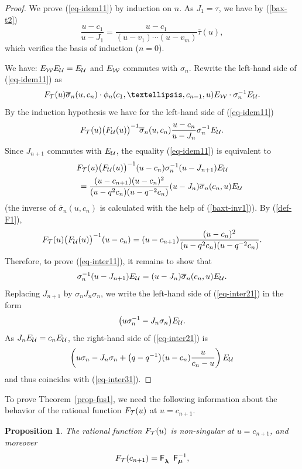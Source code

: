\documentclass[11pt]{article}
\newcommand{\bsi}{{\overline{\sigma}}}
\newcommand{\bta}{{\overline{\tau}}}
\newcommand{\lam}{\boldsymbol{\lambda}}
\newcommand{\mum}{\boldsymbol{\mu}}
\newtheorem{Proposition}[Theorem]{Proposition}
\begin{document}
\begin{proof} We prove (\ref{eq-idem11}) by induction on $n$.
As $J_1=\tau$, we have by (\ref{bax-t2})
\[
\frac{u-c_{1}}{u-J_{1}}=\frac{u-c_{1}}{(u-v_1)\cdots(u-v_m)}\bta(u)  ,
\]
which verif\/ies the basis of induction ($n=0$).


We have: $E_{{\cal{W}}}E_{{\cal{U}}}=E_{{\cal{U}}}$ and $E_{{\cal{W}}}$ commutes with $\sigma_n$.
Rewrite the left-hand side of (\ref{eq-idem11}) as
\[
F_{{\cal{T}}}(u)\bsi_{n}(u,c_n)\cdot\phi_n(c_1,\dots,c_{n-1},u) E_{{\cal{W}}}\cdot\sigma_n^{-1} E_{{\cal{U}}} .
 \]
By the induction hypothesis we have for the left-hand side of (\ref{eq-idem11})
\[
F_{{\cal{T}}}(u)\bigl(F_{{\cal{U}}}(u)\bigr)^{-1}\bsi_{n}(u,c_n)\frac{u-c_n}{u-J_n}\sigma_n^{-1} E_{{\cal{U}}} .
\]
Since $J_{n+1}$ commutes with $E_{{\cal{U}}}$, the equality (\ref{eq-idem11}) is equivalent to
\begin{gather}
F_{{\cal{T}}}(u)\bigl(F_{{\cal{U}}}(u)\bigr)^{-1}(u-c_n)\sigma_n^{-1}(u-J_{n+1})E_{{\cal{U}}}\nonumber\\
\qquad{}=
 {\frac{(u-c_{n+1})(u-c_n)^2}{(u-q^2c_n)(u-q^{-2}c_n)}}(u-J_n)\bsi_{n}(c_n,u)E_{{\cal{U}}} \label{eq-inter11}
\end{gather}
(the inverse of $\bsi_{n}(u,c_n)$ is calculated with the help of (\ref{baxt-inv1})).
By (\ref{def-F1}),
\begin{gather*}%
F_{{\cal{T}}}(u)\bigl(F_{{\cal{U}}}(u)\bigr)^{-1}(u-c_n)=(u-c_{n+1})\frac{(u-c_n)^2}{(u-q^2c_n)(u-q^{-2}c_n)}.
\end{gather*}
Therefore, to prove (\ref{eq-inter11}), it remains to show that
\begin{gather}\label{eq-inter21}
\sigma_n^{-1}(u-J_{n+1})E_{{\cal{U}}}=(u-J_n)\bsi_{n}(c_n,u)E_{{\cal{U}}}.
\end{gather}
Replacing $J_{n+1}$ by $\sigma_nJ_n\sigma_n$, we write the left-hand side of (\ref{eq-inter21}) in the form
\begin{gather}\label{eq-inter31}
\big(u\sigma_n^{-1}-J_{n}\sigma_n\big)E_{{\cal{U}}}  .
\end{gather}
As  $J_nE_{{\cal{U}}}=c_nE_{{\cal{U}}}$, the right-hand side of (\ref{eq-inter21}) is
\begin{gather*}%
\left(u\sigma_n-J_n\sigma_n+\big(q-q^{-1}\big)(u-c_n)\frac{u}{c_n-u}\right)E_{{\cal{U}}}
\end{gather*}
and thus coincides with  (\ref{eq-inter31}).
\end{proof}


To prove Theorem~\ref{prop-fus1}, we need the following
information about the behavior of the rational function $F_{{\cal{T}}}(u)$ at $u=c_{n+1}$.
\begin{Proposition}\label{prop-f1}
The rational function $F_{{\cal{T}}}(u)$ is non-singular at $u=c_{n+1}$, and moreover
\begin{gather*}%
F_{{\cal{T}}}(c_{n+1})=\mathsf{F}^{\phantom{-1}}_{\lam}  \mathsf{F}_{\mum}^{-1} ,
\end{gather*}
\end{Proposition}
\end{document}
